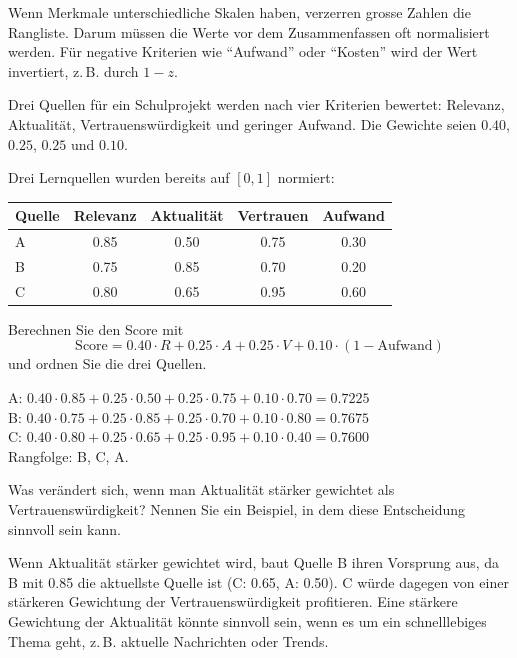 \begin{mycaution}
    Wenn Merkmale unterschiedliche Skalen haben, verzerren grosse Zahlen die Rangliste.
    Darum müssen die Werte vor dem Zusammenfassen oft normalisiert werden.
    Für negative Kriterien wie \enquote{Aufwand} oder \enquote{Kosten} wird der Wert invertiert,
    z.\,B. durch $1-z$.
\end{mycaution}

\begin{myexample}
    Drei Quellen für ein Schulprojekt werden nach vier Kriterien bewertet:
    Relevanz, Aktualität, Vertrauenswürdigkeit und geringer Aufwand.
    Die Gewichte seien $0.40$, $0.25$, $0.25$ und $0.10$.
\end{myexample}

\begin{myexercise}
    Drei Lernquellen wurden bereits auf $[0,1]$ normiert:

    \begin{center}
        \begin{tabular}{lcccc}
            \toprule
            Quelle & Relevanz & Aktualität & Vertrauen & Aufwand \\
            \midrule
            A      & 0.85     & 0.50       & 0.75      & 0.30    \\
            B      & 0.75     & 0.85       & 0.70      & 0.20    \\
            C      & 0.80     & 0.65       & 0.95      & 0.60    \\
            \bottomrule
        \end{tabular}
    \end{center}

    Berechnen Sie den Score mit
    \[
        \text{Score} = 0.40\cdot R + 0.25\cdot A + 0.25\cdot V + 0.10\cdot(1-\text{Aufwand})
    \]
    und ordnen Sie die drei Quellen.
    \begin{myanswer}
        A: $0.40\cdot0.85 + 0.25\cdot0.50 + 0.25\cdot0.75 + 0.10\cdot0.70 = 0.7225$ \\
        B: $0.40\cdot0.75 + 0.25\cdot0.85 + 0.25\cdot0.70 + 0.10\cdot0.80 = 0.7675$ \\
        C: $0.40\cdot0.80 + 0.25\cdot0.65 + 0.25\cdot0.95 + 0.10\cdot0.40 = 0.7600$ \\
        Rangfolge: B, C, A.
    \end{myanswer}
\end{myexercise}

\begin{myexercise}
    Was verändert sich, wenn man Aktualität stärker gewichtet als Vertrauenswürdigkeit?
    Nennen Sie ein Beispiel, in dem diese Entscheidung sinnvoll sein kann.
    \begin{myanswer}
        Wenn Aktualität stärker gewichtet wird, baut Quelle B ihren Vorsprung aus, da B mit 0.85 die aktuellste Quelle ist (C: 0.65, A: 0.50). C würde dagegen von einer stärkeren Gewichtung der Vertrauenswürdigkeit profitieren. Eine stärkere Gewichtung der Aktualität könnte sinnvoll sein, wenn es um ein schnelllebiges Thema geht, z.\,B. aktuelle Nachrichten oder Trends.
    \end{myanswer}
\end{myexercise}